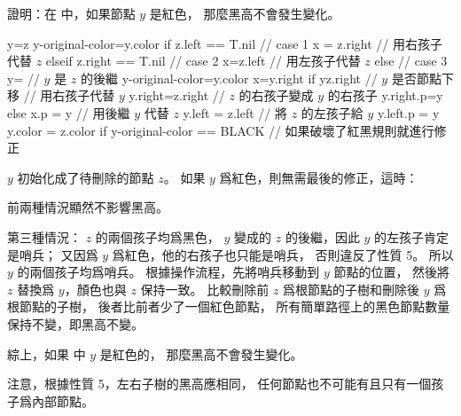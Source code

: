 \startEXERCISE
證明：在  中，如果節點 $y$ 是紅色，
那麼黑高不會發生變化。

\startCLRSCODE
y=z
y-original-color=y.color
if z.left == T.nil \hfill // case 1
	x = z.right
	 // 用右孩子代替 $z$
elseif z.right == T.nil \hfill // case 2
	x=z.left
	 // 用左孩子代替 $z$
else \hfill // case 3
	y= // $y$ 是 $z$ 的後繼
	y-original-color=y.color
	x=y.right
	if y\ne z.right // $y$ 是否節點下移
		 // 用右孩子代替 $y$
		y.right=z.right // $z$ 的右孩子變成 $y$ 的右孩子
		y.right.p=y
	else
		x.p = y
	 // 用後繼 $y$ 代替 $z$
	y.left = z.left // 將 $z$ 的左孩子給 $y$
	y.left.p = y
	y.color = z.color
if y-original-color == BLACK // 如果破壞了紅黑規則就進行修正
\stopCLRSCODE
\stopEXERCISE

\startANSWER
$y$ 初始化成了待刪除的節點 $z$。
如果 $y$ 爲紅色，則無需最後的修正，這時：

前兩種情況顯然不影響黑高。

第三種情況： $z$ 的兩個孩子均爲黑色，
 $y$ 變成的 $z$ 的後繼，因此 $y$ 的左孩子肯定是哨兵；
又因爲 $y$ 爲紅色，他的右孩子也只能是哨兵，
否則違反了性質 5。
所以 $y$ 的兩個孩子均爲哨兵。
根據操作流程，先將哨兵移動到 $y$ 節點的位置，
然後將 $z$ 替換爲 $y$，顏色也與 $z$ 保持一致。
比較刪除前 $z$ 爲根節點的子樹和刪除後 $y$ 爲根節點的子樹，
後者比前者少了一個紅色節點，
所有簡單路徑上的黑色節點數量保持不變，即黑高不變。

綜上，如果  中 $y$ 是紅色的，
那麼黑高不會發生變化。

注意，根據性質 5，左右子樹的黑高應相同，
任何節點也不可能有且只有一個孩子爲內部節點。
\stopANSWER

